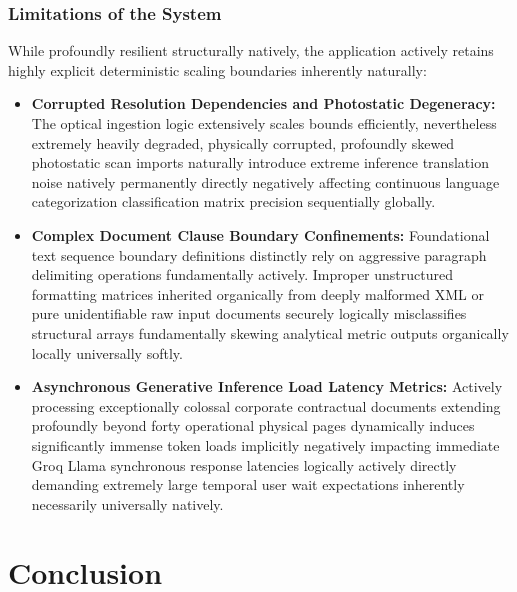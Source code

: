 \documentclass[a4paper,12pt]{report}
\begin{document}
\subsection{Limitations of the System}

While profoundly resilient structurally natively, the application actively retains highly explicit deterministic scaling boundaries inherently naturally:

\begin{itemize}
    \item \textbf{Corrupted Resolution Dependencies and Photostatic Degeneracy:} The optical ingestion logic extensively scales bounds efficiently, nevertheless extremely heavily degraded, physically corrupted, profoundly skewed photostatic scan imports naturally introduce extreme inference translation noise natively permanently directly negatively affecting continuous language categorization classification matrix precision sequentially globally.

    \item \textbf{Complex Document Clause Boundary Confinements:} Foundational text sequence boundary definitions distinctly rely on aggressive paragraph delimiting operations fundamentally actively. Improper unstructured formatting matrices inherited organically from deeply malformed XML or pure unidentifiable raw input documents securely logically misclassifies structural arrays fundamentally skewing analytical metric outputs organically locally universally softly.

    \item \textbf{Asynchronous Generative Inference Load Latency Metrics:} Actively processing exceptionally colossal corporate contractual documents extending profoundly beyond forty operational physical pages dynamically induces significantly immense token loads implicitly negatively impacting immediate Groq Llama synchronous response latencies logically actively directly demanding extremely large temporal user wait expectations inherently necessarily universally natively.
\end{itemize}

\chapter{Conclusion}
\end{document}

